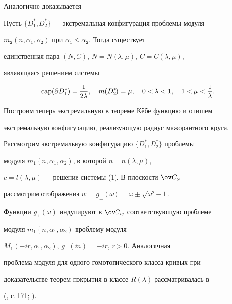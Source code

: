  


Аналогично доказывается 


 


\begin{lem} 


Пусть $\{D^*_1,D^*_2\}$ --- экстремальная конфигурация проблемы модуля 


$m_2(n,\alpha_1,\alpha_2)$ при $\alpha_1\le\alpha_2$. Тогда существует 


единственная пара $(N,C)$, $N=N(\lambda,\mu)$, $C=C(\lambda,\mu)$, 


являющаяся решением системы 


\begin{equation} 


\CAP(\partial D^*_1)=\frac{1}{2\lambda},\quad 


m(D^*_2)=\mu,\quad 0<\lambda<1,\quad 1<\mu<\frac{1}{\lambda}. 


\end{equation} 


\end{lem} 


 


Построим теперь экстремальную в теореме К\"ебе функцию и опишем 


экстремальную конфигурацию, реализующую радиус мажорантного круга. 


 


Рассмотрим экстремальную конфигурацию $\{D^*_1,D^*_2\}$ проблемы 


модуля $m_1(n,\alpha_1,\alpha_2)$, в которой $n=n(\lambda,\mu)$, 


$c=l(\lambda,\mu)$ --- решение системы (1). В плоскости $\ov C_\omega$ 


рассмотрим отображения $w=g_\pm(\omega)=\omega\pm\sqrt{\omega^2-1}$. 


Функции $g_\pm(\omega)$ индуцируют в $\ov C_w$ соответствующую проблеме 


модуля $m_1(n,\alpha_1,\alpha_2)$ проблему модуля 


$M_1(-ir,\alpha_1,\alpha_2)$, $g_-(in)=-ir$, $r>0$. Аналогичная 


проблема модуля для одного гомотопического класса кривых при 


доказательстве теорем покрытия в классе $R(\lambda)$ рассматривалась в 


(\cite{2}, с.\,171; \cite{7}). 


